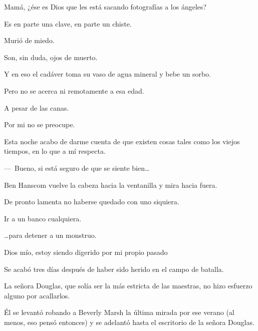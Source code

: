 \sk
Mamá, ¿ése es Dios que les
está sacando fotografías a los ángeles? 

\sk
Es en parte una clave, en parte un chiste. 

\sk
Murió de miedo. \nb{}

\sk
Son, sin duda, ojos de muerto. 

\sk
Y en eso el cadáver toma
su vaso de agua mineral y bebe un sorbo.

\sk
Pero no se acerca ni remotamente a esa edad. 

\sk
A pesar de las canas. 

\sk
Por mi no se preocupe. 

\sk
Esta noche acabo de darme cuenta de
que existen cosas tales como los viejos tiempos,
en lo que a mí respecta.

\sk
---~Bueno, si está seguro de que se siente
bien\ldots{} 

\sk
Ben Hanscom vuelve la cabeza hacia la
ventanilla y mira hacia fuera. 

\sk
De pronto lamenta
no haberse quedado con uno siquiera. 

\sk
Ir a un banco cualquiera. 

\sk
\ldots{}para detener a un monstruo. 

\sk
Dios mío, estoy siendo digerido por mi
propio pasado 

\sk
Se acabó tres días después de haber sido herido en el campo de batalla. 

\sk
La señora Douglas, que solía ser la más
estricta de las maestras, no hizo esfuerzo alguno
por acallarlos. 

\sk
Él se levantó robando a Beverly Marsh la
última mirada por ese verano (al menos, eso pensó
entonces) y se adelantó hasta el escritorio de la
señora Douglas. 

